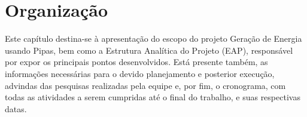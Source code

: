 \chapter[Organização]{Organização}

Este capítulo destina-se à apresentação do escopo do projeto Geração de Energia usando Pipas, bem como a Estrutura Analítica do Projeto (EAP), responsável por expor os principais pontos desenvolvidos. Está presente também, as informações necessárias para o devido planejamento e posterior execução, advindas das pesquisas realizadas pela equipe e, por fim, o cronograma, com todas as atividades a serem cumpridas até o final do trabalho, e suas respectivas datas. 
